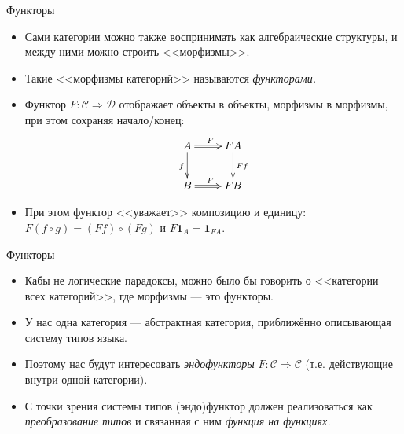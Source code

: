 \documentclass[xcolor=dvipsnames]{beamer}
\newcommand{\One}{\mathbf{1}}
\newcommand{\Cc}{\mathcal{C}}
\newcommand{\Dc}{\mathcal{D}}
\begin{document}
\begin{frame}{Функторы}
 
 \begin{itemize}[<+->]
  \item Сами категории можно также воспринимать как
алгебраические структуры, и между ними можно строить
<<морфизмы>>.
  \item Такие <<морфизмы категорий>> называются {\em функторами.}
  \item Функтор $F \colon \Cc \Rightarrow \Dc$ отображает объекты в объекты, морфизмы в морфизмы, при этом сохраняя начало/конец:
 \[
  \xymatrix{
  A \ar_f[d]\ar@{=>}^{F}[r] & F A 
     \ar^{F f}[d] \\
  B \ar@{=>}^{F}[r] & F B
  }
 \]
\vspace*{-10pt}
\item При этом функтор <<уважает>> композицию и единицу: $F(f \circ g) = (F f) \circ (F g)$ и $F \One_A = \One_{F A}$.
 \end{itemize}

\end{frame}

\begin{frame}{Функторы}
\begin{itemize}[<+->]
 \item Кабы не логические парадоксы, можно было бы говорить о
<<категории всех категорий>>, где морфизмы --- это
функторы.
 \item У нас одна категория --- абстрактная категория, приближённо описывающая систему типов языка.
 \item Поэтому нас будут интересовать {\em эндофункторы}
 $F \colon \Cc \Rightarrow \Cc$ (т.е. действующие
внутри одной категории).
\item С точки зрения системы типов (эндо)функтор должен реализоваться как {\em преобразование типов} и связанная с ним {\em функция на функциях.}
\end{itemize}

 

\end{frame}
\end{document}
